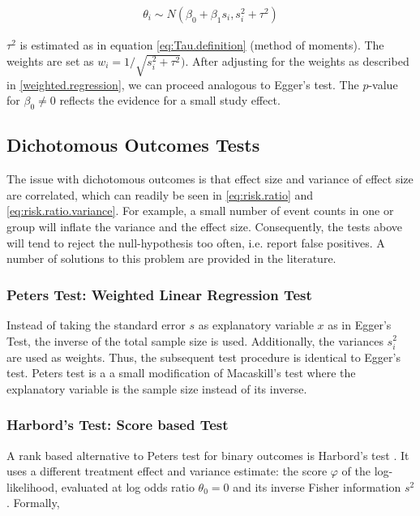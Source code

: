 \documentclass[11pt,a4paper,twoside]{book}\usepackage[]{graphicx}\usepackage[]{color}
\begin{document}
\begin{align}
\theta_i \sim N(\beta_0 + \beta_1 s_i, s_i^2 + \tau^2) \label{t.sharp.regression}
\end{align}

$\tau^2$ is estimated as in equation \ref{eq:Tau.definition} (method of moments). %
The weights are set as $w_i = 1/\sqrt{s_i^2 + \tau^2})$. After adjusting for the weights as described in \ref{weighted.regression}, we can proceed analogous to Egger's test. The $p$-value for $\beta_{0} \neq 0$ reflects the evidence for a small study effect.

\subsection{Dichotomous Outcomes Tests}
 
The issue with dichotomous outcomes is that effect size and variance of effect size are correlated, which can readily be seen in \ref{eq:risk.ratio} and \ref{eq:risk.ratio.variance}. For example, a small number of event counts in one or group will inflate the variance and the effect size. Consequently, the tests above will tend to reject the null-hypothesis too often, i.e. report false positives. A number of solutions to this problem are provided in the literature.


\subsubsection{Peters Test: Weighted Linear Regression Test} \label{sec:Peter}
Instead of taking the standard error $s$ as explanatory variable $x$ as in Egger's Test, the inverse of the total sample size is used. Additionally, the variances $s_i^2$ are used as weights. Thus, the subsequent test procedure is identical to Egger's test. Peters test is a a small modification of Macaskill's test where the explanatory variable is the sample size instead of its inverse.


\subsubsection{Harbord's Test: Score based Test} \label{sec:Harbord}
A rank based alternative to Peters test for binary outcomes is Harbord's test \citep{Harbord}.
It uses a different treatment effect and variance estimate: the score $\varphi$ of the log-likelihood, evaluated at log odds ratio $\theta_0 = 0$ and its inverse Fisher information $s^2$. Formally,
\end{document}
